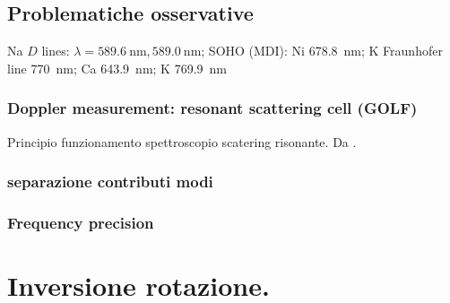 \documentclass[../main.tex]{subfiles}
\begin{document}
\begin{refsection}

\begingroup
\nocite{*}
\let\clearpage\relax
\traceon
\printbibliography[check=modesfreqobs,keyword={rev},title={\textcolor{ochre}{Biblio about: ''Osservazione dei modi: strumenti e splitting dovuto alla rotazione.''}}]
\printbibliography[check=modesfreqobs,notkeyword={rev},title={\textcolor{ochre}{Other refs about: ''Osservazione dei modi: strumenti e splitting dovuto alla rotazione.''}}]
\traceoff
\endgroup

\section{Problematiche osservative}

Na $D$ lines: $\lambda=\SI{589.6}{\nano\meter},\SI{589.0}{\nano\meter}$; SOHO (MDI): Ni \SI{678.8}{\nano\meter}; K Fraunhofer line \SI{770}{\nano\meter}; Ca \SI{643.9}{\nano\meter}; K \SI{769.9}{\nano\meter}

\subsection{Doppler measurement: resonant scattering cell (GOLF)}

Principio funzionamento spettroscopio scatering risonante. Da \cite{brookes1978resonant}.

\subsection{separazione contributi modi}
\subsection{Frequency precision}

\end{refsection}


{\let\clearpage\relax
\chapter{Inversione rotazione.}}
\PartialToc
\end{document}
